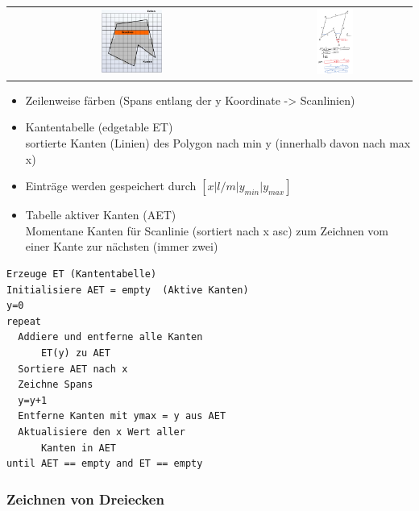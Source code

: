 \begin{tabular}{cc}
  \includegraphics[width=0.25\textwidth]{assets/scanlinien-alg.png} &
  \includegraphics[width=0.25\textwidth]{assets/scanlinien-alg-demo.png} \\
\end{tabular}

\begin{itemize}
	\item Zeilenweise färben (Spans entlang der y Koordinate -> Scanlinien)
	\item Kantentabelle (edgetable ET)\\
    sortierte Kanten (Linien) des Polygon nach min y (innerhalb davon nach max x)
  \item Einträge werden gespeichert durch $[x|l/m|y_{min}|y_{max}]$
	\item Tabelle aktiver Kanten (AET)\\
		Momentane Kanten für Scanlinie (sortiert nach x asc) zum Zeichnen vom einer Kante zur nächsten (immer zwei)
\end{itemize}

\begin{lstlisting}
Erzeuge ET (Kantentabelle)
Initialisiere AET = empty  (Aktive Kanten)
y=0
repeat
  Addiere und entferne alle Kanten
      ET(y) zu AET
  Sortiere AET nach x
  Zeichne Spans
  y=y+1
  Entferne Kanten mit ymax = y aus AET
  Aktualisiere den x Wert aller
      Kanten in AET
until AET == empty and ET == empty
\end{lstlisting}

\subsubsection{Zeichnen von Dreiecken}

